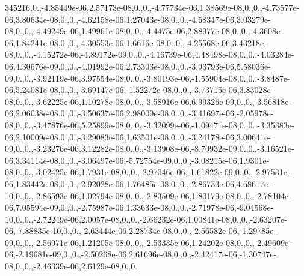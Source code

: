 {345216,0.,-\/4.\-85449e-\/06,2.\-57173e-\/08,0.,0.,-\/4.\-77734e-\/06,1.\-38569e-\/08,0.,0.,-\/4.\-73577e-\/06,3.\-80634e-\/08,0.,0.,-\/4.\-62158e-\/06,1.\-27043e-\/08,0.,0.,-\/4.\-58347e-\/06,3.\-03279e-\/08,0.,0.,-\/4.\-49249e-\/06,1.\-49961e-\/08,0.,0.,-\/4.\-4475e-\/06,2.\-88977e-\/08,0.,0.,-\/4.\-3608e-\/06,1.\-84241e-\/08,0.,0.,-\/4.\-30553e-\/06,1.\-6616e-\/08,0.,0.,-\/4.\-25568e-\/06,3.\-43218e-\/08,0.,0.,-\/4.\-15272e-\/06,-\/4.\-89172e-\/09,0.,0.,-\/4.\-16739e-\/06,4.\-48498e-\/08,0.,0.,-\/4.\-03284e-\/06,4.\-30676e-\/09,0.,0.,-\/4.\-01992e-\/06,2.\-73303e-\/08,0.,0.,-\/3.\-93793e-\/06,5.\-58036e-\/09,0.,0.,-\/3.\-92119e-\/06,3.\-97554e-\/08,0.,0.,-\/3.\-80193e-\/06,-\/1.\-55904e-\/08,0.,0.,-\/3.\-8487e-\/06,5.\-24081e-\/08,0.,0.,-\/3.\-69147e-\/06,-\/1.\-52272e-\/08,0.,0.,-\/3.\-73715e-\/06,3.\-83028e-\/08,0.,0.,-\/3.\-62225e-\/06,1.\-10278e-\/08,0.,0.,-\/3.\-58916e-\/06,6.\-99326e-\/09,0.,0.,-\/3.\-56818e-\/06,2.\-06038e-\/08,0.,0.,-\/3.\-50637e-\/06,2.\-98009e-\/08,0.,0.,-\/3.\-41697e-\/06,-\/2.\-05978e-\/08,0.,0.,-\/3.\-47876e-\/06,5.\-25899e-\/08,0.,0.,-\/3.\-32099e-\/06,-\/1.\-09471e-\/08,0.,0.,-\/3.\-35383e-\/06,2.\-10009e-\/08,0.,0.,-\/3.\-29083e-\/06,1.\-63501e-\/08,0.,0.,-\/3.\-24178e-\/06,3.\-00641e-\/09,0.,0.,-\/3.\-23276e-\/06,3.\-12282e-\/08,0.,0.,-\/3.\-13908e-\/06,-\/8.\-70932e-\/09,0.,0.,-\/3.\-16521e-\/06,3.\-34114e-\/08,0.,0.,-\/3.\-06497e-\/06,-\/5.\-72754e-\/09,0.,0.,-\/3.\-08215e-\/06,1.\-9301e-\/08,0.,0.,-\/3.\-02425e-\/06,1.\-7931e-\/08,0.,0.,-\/2.\-97046e-\/06,-\/1.\-61822e-\/09,0.,0.,-\/2.\-97531e-\/06,1.\-83442e-\/08,0.,0.,-\/2.\-92028e-\/06,1.\-76485e-\/08,0.,0.,-\/2.\-86733e-\/06,4.\-68617e-\/10,0.,0.,-\/2.\-86593e-\/06,1.\-02794e-\/08,0.,0.,-\/2.\-83509e-\/06,1.\-80179e-\/08,0.,0.,-\/2.\-78104e-\/06,7.\-05594e-\/09,0.,0.,-\/2.\-75987e-\/06,1.\-33633e-\/08,0.,0.,-\/2.\-71978e-\/06,-\/9.\-04568e-\/10,0.,0.,-\/2.\-72249e-\/06,2.\-0057e-\/08,0.,0.,-\/2.\-66232e-\/06,1.\-00841e-\/08,0.,0.,-\/2.\-63207e-\/06,-\/7.\-88835e-\/10,0.,0.,-\/2.\-63444e-\/06,2.\-28734e-\/08,0.,0.,-\/2.\-56582e-\/06,-\/1.\-29785e-\/09,0.,0.,-\/2.\-56971e-\/06,1.\-21205e-\/08,0.,0.,-\/2.\-53335e-\/06,1.\-24202e-\/08,0.,0.,-\/2.\-49609e-\/06,-\/2.\-19681e-\/09,0.,0.,-\/2.\-50268e-\/06,2.\-61696e-\/08,0.,0.,-\/2.\-42417e-\/06,-\/1.\-30747e-\/08,0.,0.,-\/2.\-46339e-\/06,2.\-6129e-\/08,0.,0.\-}
